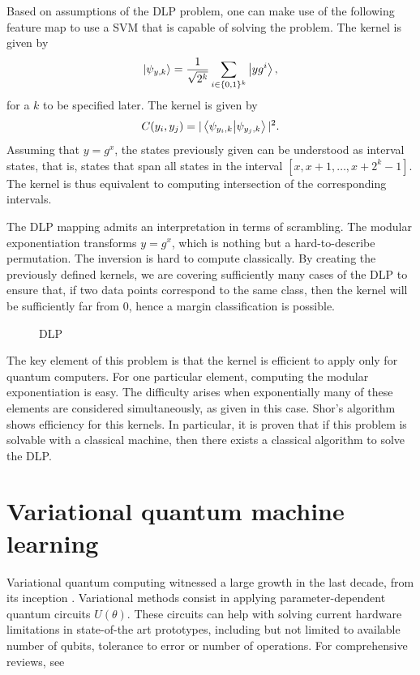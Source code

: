\documentclass[]{report}
\begin{document}
Based on assumptions of the DLP problem, one can make use of the following feature map to use a SVM that is capable of solving the problem. The kernel is given by
\begin{equation}
\ket{\psi_{y, k}} = \frac{1}{\sqrt{2^k}} \sum_{i \in \{ 0, 1\}^k } \ket{y g^{i}}, 
\end{equation}
for a $k$ to be specified later. The kernel is given by
\begin{equation}
C(y_i, y_j) = \vert \braket{\psi_{y_i, k}}{\psi_{y_j, k}}\vert^2.
\end{equation}
Assuming that $y = g^x$, the states previously given can be understood as interval states, that is, states that span all states in the interval $[x, x+1, \ldots, x + 2^k - 1]$. The kernel is thus equivalent to computing intersection of the corresponding intervals. 

The DLP mapping admits an interpretation in terms of scrambling. The modular exponentiation transforms $y = g^x$, which is nothing but a hard-to-describe permutation. The inversion is hard to compute classically. By creating the previously defined kernels, we are covering sufficiently many cases of the DLP to ensure that, if two data points correspond to the same class, then the kernel will be sufficiently far from $0$, hence a margin classification is possible. 

\begin{figure}
\caption{DLP}
\label{fig.dlp}
\end{figure}

The key element of this problem is that the kernel is efficient to apply only for quantum computers. For one particular element, computing the modular exponentiation is easy. The difficulty arises when exponentially many of these elements are considered simultaneously, as given in this case. Shor's algorithm \cite{shor1997polynomialtime} shows efficiency for this kernels. In particular, it is proven that if this problem is solvable with a classical machine, then there exists a classical algorithm to solve the DLP.  

\section{Variational quantum machine learning}\label{sec.variational}

Variational quantum computing witnessed a large growth in the last decade, from its inception \cite{peruzzo2014variational}. Variational methods consist in applying parameter-dependent quantum circuits $U(\theta)$. These circuits can help with solving current hardware limitations in state-of-the art prototypes, including but not limited to available number of qubits, tolerance to error or number of operations. For comprehensive reviews, see \cite{bharti2021noisy, cerezo2021variational}
\end{document}
